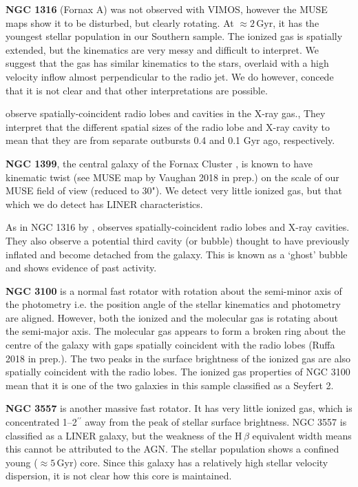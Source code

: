 \textbf{NGC 1316} (Fornax A) was not observed with VIMOS, however the MUSE maps show it to be disturbed, but clearly rotating. At $\approx 2$\,Gyr, it has the youngest stellar population in our Southern sample. The ionized gas is spatially extended, but the kinematics are very messy and difficult to interpret. We suggest that the gas has similar kinematics to the stars, overlaid with a high velocity inflow almost perpendicular to the radio jet. We do however, concede that it is not clear and that other interpretations are possible. 

\citet{Lanz2010} observe spatially-coincident radio lobes and cavities in the X-ray gas., They interpret that the different spatial sizes of the radio lobe and X-ray cavity to mean that they are from separate outbursts 0.4 and 0.1 Gyr ago, respectively.

\textbf{NGC 1399}, the central galaxy of the Fornax Cluster \citep{Jordan2007}, is known to have kinematic twist (see MUSE map by Vaughan 2018 in prep.) on the scale of our MUSE field of view (reduced to 30"). We detect very little ionized gas, but that which we do detect has LINER characteristics. 

As in NGC 1316 by \citet{Lanz2010}, \citet{Su2017} observes spatially-coincident radio lobes and X-ray cavities. They also observe a potential third cavity (or bubble) thought to have previously inflated and become detached from the galaxy. This is known as a `ghost' bubble and shows evidence of past activity.

\textbf{NGC 3100} is a normal fast rotator with rotation about the semi-minor axis of the photometry i.e. the position angle of the stellar kinematics and photometry are aligned. However, both the ionized and the molecular gas is rotating about the semi-major axis. The molecular gas appears to form a broken ring about the centre of the galaxy with gaps spatially coincident with the radio lobes (Ruffa 2018 in prep.). The two peaks in the surface brightness of the ionized gas are also spatially coincident with the radio lobes. The ionized gas properties of NGC 3100 mean that it is one of the two galaxies in this sample classified as a Seyfert 2. 

\textbf{NGC 3557} is another massive fast rotator. It has very little ionized gas, which is concentrated 1--2$^{\prime\prime}$ away from the peak of stellar surface brightness. NGC 3557 is classified as a LINER galaxy, but the weakness of the H\,$\beta$ equivalent width means this cannot be attributed to the AGN. The stellar population shows a confined young ($\approx 5$\,Gyr) core. Since this galaxy has a relatively high stellar velocity dispersion, it is not clear how this core is maintained. 

